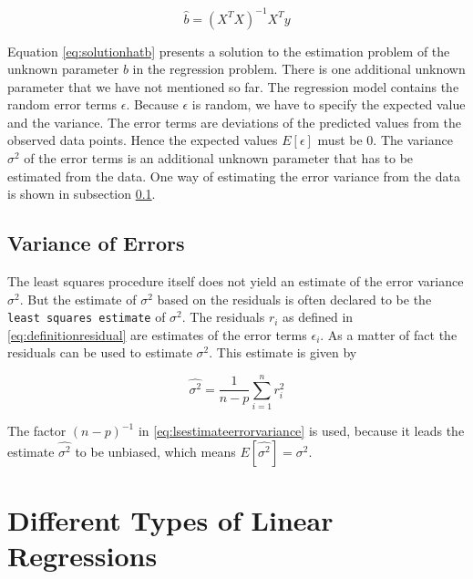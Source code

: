 \documentclass[]{book}
\theoremstyle{definition}
\theoremstyle{definition}
\theoremstyle{definition}
\theoremstyle{remark}
\begin{document}
\begin{equation}
   \hat{b} = (X^TX)^{-1}X^Ty
  \label{eq:solutionhatb}
\end{equation}

Equation \eqref{eq:solutionhatb} presents a solution to the estimation problem of the unknown parameter \(b\) in the regression problem. There is one additional unknown parameter that we have not mentioned so far. The regression model contains the random error terms \(\epsilon\). Because \(\epsilon\) is random, we have to specify the expected value and the variance. The error terms are deviations of the predicted values from the observed data points. Hence the expected values \(E\left[\epsilon \right]\) must be \(0\). The variance \(\sigma^2\) of the error terms is an additional unknown parameter that has to be estimated from the data. One way of estimating the error variance from the data is shown in subsection \ref{asm-flem-error-variance}.

\hypertarget{asm-flem-error-variance}{%
\subsection{Variance of Errors}\label{asm-flem-error-variance}}

The least squares procedure itself does not yield an estimate of the error variance \(\sigma^2\). But the estimate of \(\sigma^2\) based on the residuals is often declared to be the \texttt{least\ squares\ estimate} of \(\sigma^2\). The residuals \(r_i\) as defined in \eqref{eq:definitionresidual} are estimates of the error terms \(\epsilon_i\). As a matter of fact the residuals can be used to estimate \(\sigma^2\). This estimate is given by

\begin{equation}
  \widehat{\sigma^2} = \frac{1}{n-p} \sum_{i=1}^n r_i^2
  \label{eq:lsestimateerrorvariance}
\end{equation}

The factor \((n-p)^{-1}\) in \eqref{eq:lsestimateerrorvariance} is used, because it leads the estimate \(\widehat{\sigma^2}\) to be unbiased, which means \(E\left[\widehat{\sigma^2} \right] = \sigma^2\).

\hypertarget{asm-flem-types-of-regression}{%
\section{Different Types of Linear Regressions}\label{asm-flem-types-of-regression}}
\end{document}
